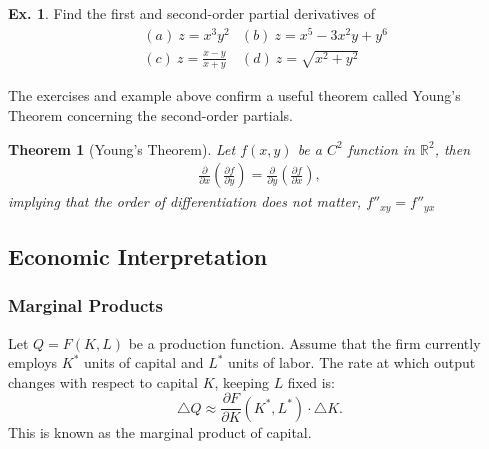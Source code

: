\documentclass[10pt,a4paper]{book}
\newtheorem{theorem}{Theorem}[section]
\theoremstyle{definition}\newtheorem{definition}{Definition}
\theoremstyle{definition}\newtheorem{fact}{Fact}
\theoremstyle{definition}\newtheorem{ex}{Ex.}
\theoremstyle{definition}\newtheorem{project}{Project}
\theoremstyle{definition}\newtheorem{problem}{Problem}
\theoremstyle{definition}\newtheorem{example}{Example}
\numberwithin{theorem}{chapter}
\numberwithin{corollary}{chapter}
\numberwithin{assumption}{chapter}
\numberwithin{definition}{chapter}
\numberwithin{prop}{chapter}
\numberwithin{notation}{chapter}
\numberwithin{problem}{chapter}
\numberwithin{example}{chapter}
\numberwithin{fact}{chapter}
\numberwithin{ex}{chapter}
\newenvironment{ftheorem}
{\begin{mdframed}\begin{theorem}}
		{\end{theorem}\end{mdframed}}
\def\R{\mathbb R}
\def\R{\mathbb R}
\begin{document}
	\begin{ex}
		Find the first and second-order partial derivatives of
		\begin{align*}
			& (a) \ z = x^3 y^2            
			& (b) \ z = x^5 - 3x^2 y + y^6 \\
			& (c) \ z = \frac{x-y}{x+y}    
			& (d) \ z = \sqrt{x^2 + y^2}   
		\end{align*}
	\end{ex}
	
	The exercises and example above confirm a useful theorem called Young's Theorem concerning the second-order partials.
	\begin{ftheorem}[Young's Theorem]
		Let $f(x,y)$ be a $C^2$ function in $\R^2$, then
		\begin{align*}
			\frac{\partial }{\partial x} \left(\frac{\partial f}{\partial y}\right) = \frac{\partial }{\partial y} \left(\frac{\partial f}{\partial x}\right) ,
		\end{align*}
		implying that the order of differentiation does not matter, $f''_{xy} = f''_{yx}$
	\end{ftheorem}
	
	\subsection{Economic Interpretation}
	\subsubsection{Marginal Products}
	Let $Q = F(K, L)$ be a production function. Assume that the firm currently employs $K^*$ units of capital and $L^*$ units of labor. The rate at which output changes with respect to capital $K$, keeping $L$ fixed is:
	\begin{equation*}
		\triangle Q \approx \frac{\partial F}{\partial K}(K^*, L^*) \cdot \triangle K.
	\end{equation*}
	This is known as the marginal product of capital.
	
\end{document}
